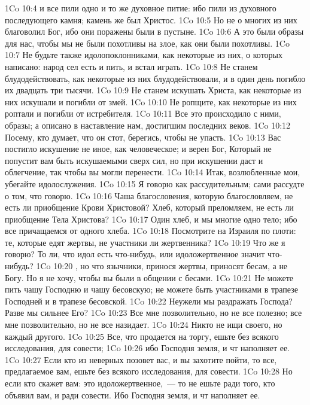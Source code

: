 \vs 1Co 10:4 и все пили одно и то же духовное питие: ибо пили из духовного последующего камня; камень же был Христос.
\vs 1Co 10:5 Но не о многих из них благоволил Бог, ибо они поражены были в пустыне.
\vs 1Co 10:6 А это были образы для нас, чтобы мы не были похотливы на злое, как они были похотливы.
\vs 1Co 10:7 Не будьте также идолопоклонниками, как некоторые из них, о которых написано: народ сел есть и пить, и встал играть.
\vs 1Co 10:8 Не станем блудодействовать, как некоторые из них блудодействовали, и в один день погибло их двадцать три тысячи.
\vs 1Co 10:9 Не станем искушать Христа, как некоторые из них искушали и погибли от змей.
\vs 1Co 10:10 Не ропщите, как некоторые из них роптали и погибли от истребителя.
\vs 1Co 10:11 Все это происходило с ними,  образы; а описано в наставление нам, достигшим последних веков.
\vs 1Co 10:12 Посему, кто думает, что он стот, берегись, чтобы не упасть.
\vs 1Co 10:13 Вас постигло искушение не иное, как человеческое; и верен Бог, Который не попустит вам быть искушаемыми сверх сил, но при искушении даст и облегчение, так чтобы вы могли перенести.
\rsbpar\vs 1Co 10:14 Итак, возлюбленные мои, убегайте идолослужения.
\vs 1Co 10:15 Я говорю  как рассудительным; сами рассудте о том, что говорю.
\vs 1Co 10:16 Чаша благословения, которую благословляем, не есть ли приобщение Крови Христовой? Хлеб, который преломляем, не есть ли приобщение Тела Христова?
\vs 1Co 10:17 Один хлеб, и мы многие одно тело; ибо все причащаемся от одного хлеба.
\vs 1Co 10:18 Посмотрите на Израиля по плоти: те, которые едят жертвы, не участники ли жертвенника?
\vs 1Co 10:19 Что же я говорю? То ли, что идол есть что-нибудь, или идоложертвенное значит что-нибудь?
\vs 1Co 10:20 , но что язычники, принося жертвы, приносят бесам, а не Богу. Но я не хочу, чтобы вы были в общении с бесами.
\vs 1Co 10:21 Не можете пить чашу Господню и чашу бесовскую; не можете быть участниками в трапезе Господней и в трапезе бесовской.
\vs 1Co 10:22 Неужели мы  раздражать Господа? Разве мы сильнее Его?
\rsbpar\vs 1Co 10:23 Все мне позволительно, но не все полезно; все мне позволительно, но не все назидает.
\vs 1Co 10:24 Никто не ищи своего, но каждый  другого.
\vs 1Co 10:25 Все, что продается на торгу, ешьте без всякого исследования, для  совести;
\vs 1Co 10:26 ибо Господня земля, и чт наполняет ее.
\vs 1Co 10:27 Если кто из неверных позовет вас, и вы захотите пойти, то все, предлагаемое вам, ешьте без всякого исследования, для  совести.
\vs 1Co 10:28 Но если кто скажет вам: это идоложертвенное,~--- то не ешьте ради того, кто объявил вам, и ради совести. Ибо Господня земля, и чт наполняет ее.
